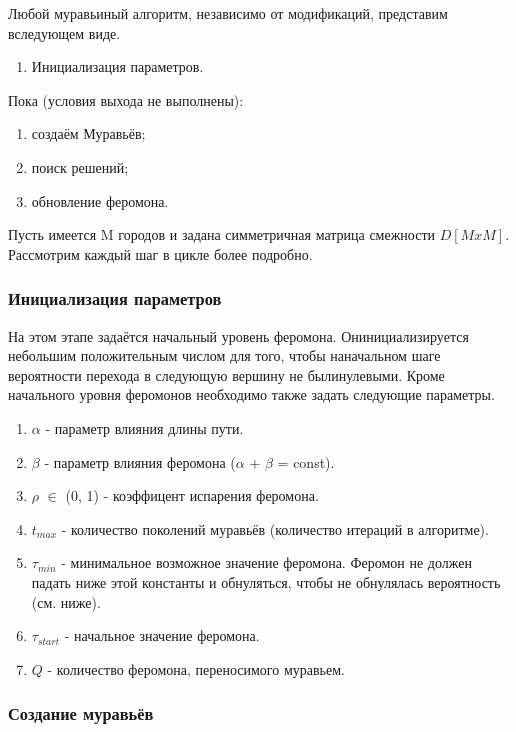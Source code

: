 \documentclass[a4paper,14pt]{report}
\begin{document}
Любой муравьиный алгоритм, независимо от модификаций, представим вследующем виде.
\begin{enumerate}
	\item Инициализация параметров.
\end{enumerate}
Пока (условия выхода не выполнены):
\begin{enumerate}
	\item создаём Муравьёв;
	\item поиск решений;
	\item обновление феромона.
\end{enumerate}

Пусть имеется M городов и задана симметричная матрица смежности $D[M x M]$.
Рассмотрим каждый шаг в цикле более подробно.

\subsubsection*{Инициализация параметров}

На  этом  этапе  задаётся  начальный  уровень  феромона.    Онинициализируется  небольшим  положительным  числом  для  того,  чтобы  наначальном  шаге  вероятности  перехода  в  следующую  вершину  не  былинулевыми. Кроме начального уровня феромонов необходимо также задать следующие параметры.
\begin{enumerate}
	\item $\alpha$ - параметр влияния длины пути.
	\item $\beta$ - параметр влияния феромона ($\alpha$ + $\beta$ = const).
	\item $\rho$ $\in$ (0, 1) - коэффицент испарения феромона.
	\item $t_{max}$ - количество поколений муравьёв (количество итераций в алгоритме).
	\item $\tau_{min}$ - минимальное возможное значение феромона. Феромон не должен падать ниже этой константы и обнуляться, чтобы не обнулялась вероятность (см. ниже).
	\item $\tau_{start}$ - начальное значение феромона.
	\item $Q$ - количество феромона, переносимого муравьем.
\end{enumerate}

\subsubsection*{Создание муравьёв}
\end{document}
